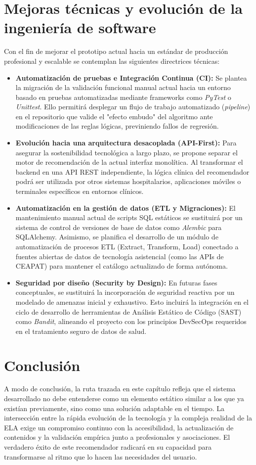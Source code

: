 \section{Mejoras técnicas y evolución de la ingeniería de software}
Con el fin de mejorar el prototipo actual hacia un estándar de producción profesional y escalable se contemplan las siguientes directrices técnicas:
\begin{itemize}
    	\item \textbf{Automatización de pruebas e Integración Continua (CI):} Se plantea la migración de la validación funcional manual actual hacia un entorno basado en pruebas automatizadas mediante frameworks como \textit{PyTest} o \textit{Unittest}. Ello permitirá desplegar un flujo 		de trabajo automatizado (\textit{pipeline}) en el repositorio que valide el "efecto embudo" del algoritmo ante modificaciones de las reglas lógicas, previniendo fallos de regresión.
    	\item \textbf{Evolución hacia una arquitectura desacoplada (API-First):} Para asegurar la sostenibilidad tecnológica a largo plazo, se propone separar el motor de recomendación de la actual interfaz monolítica. Al transformar el backend en una API REST independiente, la lógica 			clínica del recomendador podrá ser utilizada por otros sistemas hospitalarios, aplicaciones móviles o terminales específicos en entornos clínicos.
    	\item \textbf{Automatización en la gestión de datos (ETL y Migraciones):} El mantenimiento manual actual de scripts SQL estáticos se sustituirá por un sistema de control de versiones de base de datos como \textit{Alembic} para SQLAlchemy. Asimismo, se planifica el desarrollo de 		un módulo de automatización de procesos ETL (Extract, Transform, Load) conectado a fuentes abiertas de datos de tecnología asistencial (como las APIs de CEAPAT) \cite{ceapat:productos} para mantener el catálogo actualizado de forma autónoma.
    	\item \textbf{Seguridad por diseño (Security by Design):} En futuras fases conceptuales, se sustituirá la incorporación de seguridad reactiva por un modelado de amenazas inicial y exhaustivo. Esto incluirá la integración en el ciclo de desarrollo de herramientas de Análisis Estático de 	Código (SAST) como \textit{Bandit}, alineando el proyecto con los principios DevSecOps requeridos en el tratamiento seguro de datos de salud.
\end{itemize}

\section{Conclusión}
A modo de conclusión, la ruta trazada en este capítulo refleja que el sistema desarrollado no debe entenderse como un elemento estático similar a los que ya existían previamente, sino como una solución adaptable en el tiempo. La intersección entre la rápida evolución de la tecnología y la compleja realidad de la ELA exige un compromiso continuo con la accesibilidad, la actualización de contenidos y la validación empírica junto a profesionales y asociaciones. El verdadero éxito de este recomendador radicará en su capacidad para transformarse al ritmo que lo hacen las necesidades del usuario.